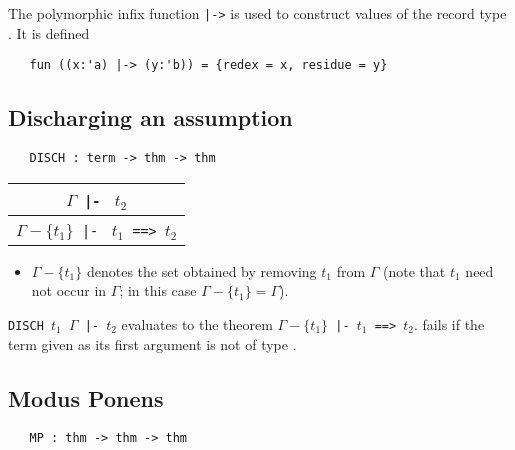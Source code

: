 The polymorphic \ML{} infix function {\small\verb+|->+} is used to
construct values of the record type .  It is defined
\begin{verbatim}
   fun ((x:'a) |-> (y:'b)) = {redex = x, residue = y}
\end{verbatim}

\bigskip

\subsection{Discharging an assumption}


\begin{holboxed}
\begin{verbatim}
   DISCH : term -> thm -> thm
\end{verbatim}\end{holboxed}

\begin{center}
\begin{tabular}{c}
$\Gamma${\small\verb+ |- +} $t_2$ \\ \hline
$\Gamma{-}\{t_1\}${\small\verb+ |- +} $t_1${\small\verb+ ==> +}$t_2$
\end{tabular}
\end{center}

\begin{itemize}
\item  $\Gamma{-}\{t_1\}$ denotes the set obtained by removing $t_1$
from $\Gamma$ (note that $t_1$ need not occur in $\Gamma$; in this case
$\Gamma{-}\{t_1\} = \Gamma$).
\end{itemize}

\noindent
{\small\verb+DISCH +}$t_1${\small\verb+ +}$\Gamma${\small\verb+ |- +}$t_2$
evaluates to the theorem
$\Gamma{-}\{t_1\}${\small\verb+ |- +}$t_1${\small\verb+ ==> +}$t_2$.
 fails if the term given as its first argument is not of
type .



\bigskip

\subsection{Modus Ponens}


\begin{holboxed}
\begin{verbatim}
   MP : thm -> thm -> thm
\end{verbatim}\end{holboxed}


